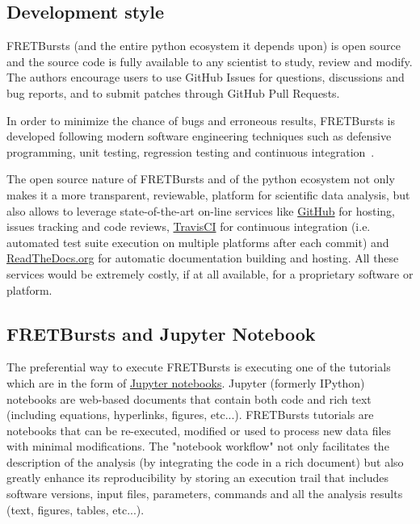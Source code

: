 \subsection{Development style}

FRETBursts (and the entire python ecosystem it depends upon) is open source 
and the source code is fully available to any scientist to study, 
review and modify.
The authors encourage users to use GitHub Issues for questions, discussions
and bug reports, and to submit patches through GitHub Pull Requests.

In order to minimize the chance of bugs and erroneous results, FRETBursts is developed
following modern software engineering techniques such 
as defensive programming, unit testing, regression testing and continuous integration~\cite{Wilson_2014}.

The open source nature of FRETBursts and of the python ecosystem 
not only makes it a more transparent, reviewable, platform 
for scientific data analysis, but also allows 
to leverage state-of-the-art on-line services like \href{http://https://github.com}{GitHub} for hosting, 
issues tracking and code reviews, 
\href{https://travis-ci.org}{TravisCI} for continuous integration 
(i.e. automated test suite execution on multiple platforms after each commit) 
and \href{https://readthedocs.org/}{ReadTheDocs.org} for automatic documentation building and hosting. 
All these services would be extremely costly, if at all available, 
for a proprietary software or platform.

\subsection{FRETBursts and Jupyter Notebook}

The preferential way to execute FRETBursts is executing one of the tutorials 
which are in the form of \href{http://ipython.org/notebook.html}{Jupyter notebooks}.
Jupyter (formerly IPython) notebooks are web-based documents that contain both 
code and rich text (including equations, hyperlinks, figures, etc...).
FRETBursts tutorials are notebooks that can be re-executed,
modified or used to process new data files with minimal modifications.
The "notebook workflow"\cite{Shen_2014} not only facilitates 
the description of the analysis (by integrating the code in a rich document)
but also greatly enhance its reproducibility by storing an execution trail
that includes software versions, input files, parameters, commands and all
the analysis results (text, figures, tables, etc...).

